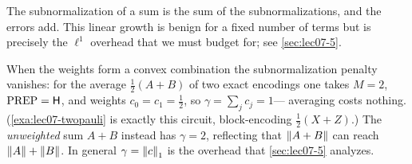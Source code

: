 The subnormalization of a sum is the sum of the subnormalizations, and the errors
add. This linear growth is benign for a fixed number of terms but is precisely the
$\ell^1$ overhead that we must budget for; see \cref{sec:lec07-5}.

\begin{remark}
\label{rem:lec07-average}
When the weights form a convex combination the subnormalization penalty vanishes: for
the average $\tfrac12(A+B)$ of two exact encodings one takes $M=2$,
$\mathrm{PREP}=\mathsf{H}$, and weights $c_0=c_1=\tfrac12$, so $\gamma=\sum_j c_j=1$---%
averaging costs nothing. (\cref{exa:lec07-twopauli} is exactly this circuit, block-encoding
$\tfrac12(X+Z)$.) The \emph{unweighted} sum $A+B$ instead has $\gamma=2$, reflecting
that $\left\lVert A+B \right\rVert$ can reach $\left\lVert A \right\rVert+\left\lVert B \right\rVert$. In general $\gamma=\left\lVert c \right\rVert_1$ is the
overhead that \cref{sec:lec07-5} analyzes.
\end{remark}

